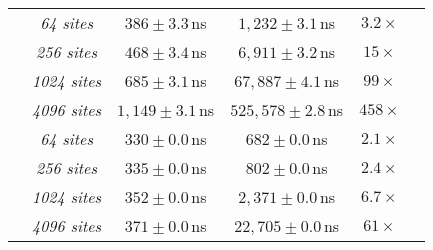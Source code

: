 \begin{table}[ht]
\begin{tabular}{l c c c c c}
& \textit{64 sites}
  & \(386 \pm 3.3\)\,ns
  & \(1{,}232 \pm 3.1\)\,ns
  & \(3.2\times\) \\
& \textit{256 sites}
  & \(468 \pm 3.4\)\,ns
  & \(6{,}911 \pm 3.2\)\,ns
  & \(15\times\) \\
& \textit{1024 sites}
  & \(685 \pm 3.1\)\,ns
  & \(67{,}887 \pm 4.1\)\,ns
  & \(99\times\) \\
& \textit{4096 sites}
  & \(1{,}149 \pm 3.1\)\,ns
  & \(525{,}578 \pm 2.8\)\,ns
  & \(458\times\) \\
\cmidrule(lr){2-5}

& \textit{64 sites}
  & \(330 \pm 0.0\)\,ns
  & \(682 \pm 0.0\)\,ns
  & \(2.1\times\) \\
& \textit{256 sites}
  & \(335 \pm 0.0\)\,ns
  & \(802 \pm 0.0\)\,ns
  & \(2.4\times\) \\
& \textit{1024 sites}
  & \(352 \pm 0.0\)\,ns
  & \(2{,}371 \pm 0.0\)\,ns
  & \(6.7\times\) \\
& \textit{4096 sites}
  & \(371 \pm 0.0\)\,ns
  & \(22{,}705 \pm 0.0\)\,ns
  & \(61\times\) \\
\bottomrule
\end{tabular}
\end{table}
